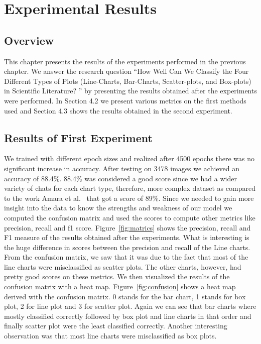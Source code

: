\documentclass[12pt, a4paper,oneside]{report}
\begin{document}
\chapter{Experimental Results}

 \section{Overview}
This chapter presents the results of the experiments performed in the previous chapter. We answer the research question
``How Well Can We Classify the Four Different Types of Plots (Line-Charts, Bar-Charts, Scatter-plots, and Box-plots) in Scientific Literature? '' by presenting the results obtained after the experiments were performed. In Section 4.2 we present various metrics on the first methods used and Section 4.3 shows the results obtained in the second experiment.

\section{Results of First Experiment}
We trained with different epoch sizes and realized after 4500 epochs there was no significant increase in accuracy. After testing on 3478 images we achieved an accuracy of 88.4\%.  88.4\% was considered a good score since we had a wider variety of chats for each chart type, therefore, more complex dataset as compared to the work Amara et al.~\cite{amara2017convolutional} that got a score of 89\%. Since we needed to gain more insight into the data to know the strengths and weakness of our model we computed the confusion matrix and used the scores to compute other metrics like precision, recall and f1 score. Figure~\ref{fig:matrics} shows the precision, recall and F1 measure of the results obtained after the experiments. What is interesting is the huge difference in scores between the precision and recall of the Line charts. From the confusion matrix, we saw that it was due to the fact that most of the line charts were misclassified as scatter plots. The other charts, however, had pretty good scores on these metrics. We then visualized the results of the confusion matrix with a heat map. Figure~\ref{fig:confusion} shows a heat map derived with the confusion matrix. 0 stands for the bar chart, 1 stands for box plot, 2 for line plot and 3 for scatter plot. Again we can see that bar charts where mostly classified correctly followed by box plot and line charts in that order and finally scatter plot were the least classified correctly. Another interesting observation was that most line charts were misclassified as box plots.
\end{document}
